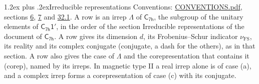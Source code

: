 \documentclass[10pt,a4paper]{article}
\makeatletter
\renewcommand\section{\@startsection{section}{1}{\z@}{-3ex plus -1ex minus -.2ex}%
  {1.2ex plus .2ex}{\normalfont\large\sffamily\bfseries\color{parttitle}}}
\numberwithin{equation}{section}
\newcommand{\grp}[1]{\mathsf{#1}}
\newcommand{\fsind}{\nu_{\mathrm{FS}}}
\makeatother
\begin{document}
\section{Irreducible representations}\label{s:irreps}
Conventions: \href{../../CONVENTIONS.pdf}{CONVENTIONS.pdf}, sections \href{../../../rotation/CONVENTIONS.pdf\#conv.6}{6}, \href{../../../rotation/CONVENTIONS.pdf\#conv.7}{7} and \href{../../CONVENTIONS.pdf\#conv.32.1}{32.1}.
\leavevmode\label{n:irrep.Delta}A row is an irrep $\Lambda$ of $\grp{C_{7h}}$, the subgroup of the unitary elements of $\grp{C_{7h}1'}$, in the order of the section Irreducible representations of the document of \href{../../../rotation/data/pdf/C7h.pdf}{$\grp{C_{7h}}$}. \label{n:index.dimension}\label{n:index.frobenius}\label{n:head.irrep}\label{n:head.reality}\label{n:head.conjugate}A row gives its dimension $d$, its Frobenius--Schur indicator $\fsind$, its reality and its complex conjugate (conjugate, a dash for the others), as in that section. \label{n:head.case.corep}\label{n:head.corep}A row also gives the case of $\Lambda$ and the corepresentation that contains it (corep), named by its irreps. In magnetic type II a real irrep alone is of case (a), and a complex irrep forms a corepresentation of case (c) with its conjugate.
\setlength{\emergencystretch}{2em}\par\setlength{\emergencystretch}{0pt}
\end{document}
